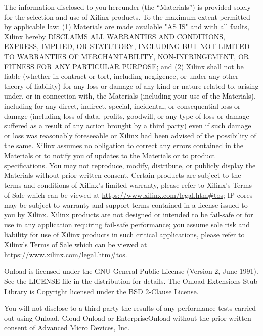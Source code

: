 
The information disclosed to you hereunder (the “Materials”) is provided 
solely for the selection and use of Xilinx products. To the maximum extent 
permitted by applicable law: (1) Materials are made available "AS IS" and 
with all faults, Xilinx hereby DISCLAIMS ALL WARRANTIES AND CONDITIONS, 
EXPRESS, IMPLIED, OR STATUTORY, INCLUDING BUT NOT LIMITED TO WARRANTIES OF 
MERCHANTABILITY, NON-INFRINGEMENT, OR FITNESS FOR ANY PARTICULAR PURPOSE; and 
(2) Xilinx shall not be liable (whether in contract or tort, including 
negligence, or under any other theory of liability) for any loss or damage of 
any kind or nature related to, arising under, or in connection with, the 
Materials (including your use of the Materials), including for any direct, 
indirect, special, incidental, or consequential loss or damage (including 
loss of data, profits, goodwill, or any type of loss or damage suffered as a 
result of any action brought by a third party) even if such damage or loss 
was reasonably foreseeable or Xilinx had been advised of the possibility of 
the same. Xilinx assumes no obligation to correct any errors contained in the 
Materials or to notify you of updates to the Materials or to product 
specifications. You may not reproduce, modify, distribute, or publicly 
display the Materials without prior written consent. Certain products are 
subject to the terms and conditions of Xilinx’s limited warranty, please 
refer to Xilinx’s Terms of Sale which can be viewed at 
\href{https://www.xilinx.com/legal.htm\#tos}{https://www.xilinx.com/legal.htm\#tos}; 
IP cores may be subject to warranty and support terms contained in a license 
issued to you by Xilinx. Xilinx products are not designed or intended to be 
fail-safe or for use in any application requiring fail-safe performance; you 
assume sole risk and liability for use of Xilinx products in such critical 
applications, please refer to Xilinx’s Terms of Sale which can be viewed at 
\href{https://www.xilinx.com/legal.htm\#tos}{https://www.xilinx.com/legal.htm\#tos}.

Onload is licensed under the GNU General Public License (Version 2, June
1991). See the LICENSE file in the distribution for details. The Onload
Extensions Stub Library is Copyright licensed under the BSD 2-Clause
License.

You will not disclose to a third party the results of any performance
tests carried out using Onload, Cloud Onload  or EnterpriseOnload without the 
prior written consent of Advanced Micro Devices, Inc.

